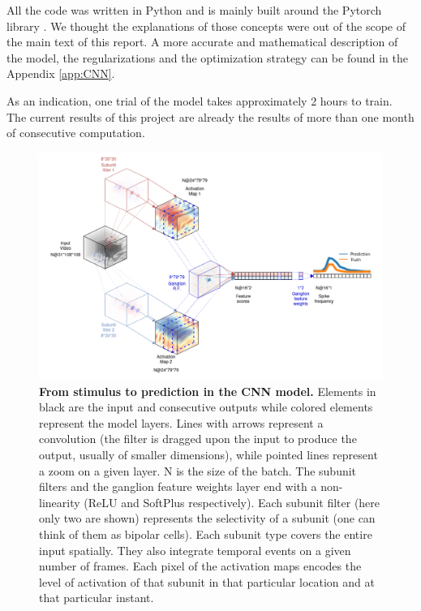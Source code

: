 All the code was written in Python and is mainly built around the Pytorch
library \citep{pytorch}.
We thought the explanations of those concepts were out of the scope of the main
text of this report. A more accurate and mathematical description of the model,
the regularizations and the optimization strategy can be found in the Appendix
\ref{app:CNN}.

As an indication, one trial of the model takes approximately 2 hours to train.
The current results of this project are already the results of more than one
month of consecutive computation.

\begin{figure}
    \centering
    \includegraphics[width=\textwidth]{pics/CNNSimpleWithImgs.png}
    \caption{\textbf{From stimulus to prediction in the CNN model.} Elements in
        black are the input and consecutive outputs while colored
        elements
        represent the model layers. Lines with arrows represent a convolution
        (the
        filter is dragged upon the input to produce the output, usually of
        smaller
        dimensions), while pointed lines represent a zoom on a given layer. N
        is the size of the batch. The subunit filters and the ganglion feature
        weights layer end
        with a non-linearity (ReLU and SoftPlus respectively).
        Each subunit filter (here only two are shown) represents the
        selectivity
        of a subunit (one can think of them as bipolar cells). Each subunit
        type covers the entire input spatially. They also integrate temporal
        events on a given number of frames. Each pixel of the
        activation maps encodes the level of activation of that subunit in that
        particular location and at that particular instant.
}
\end{figure}
